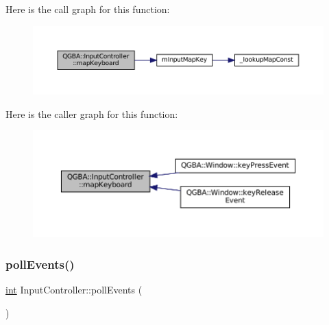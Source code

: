 Here is the call graph for this function\+:
\nopagebreak
\begin{figure}[H]
\begin{center}
\leavevmode
\includegraphics[width=350pt]{class_q_g_b_a_1_1_input_controller_a0b30490d7d98cf90002e1d7d4a9dde01_cgraph}
\end{center}
\end{figure}
Here is the caller graph for this function\+:
\nopagebreak
\begin{figure}[H]
\begin{center}
\leavevmode
\includegraphics[width=350pt]{class_q_g_b_a_1_1_input_controller_a0b30490d7d98cf90002e1d7d4a9dde01_icgraph}
\end{center}
\end{figure}
\mbox{\label{class_q_g_b_a_1_1_input_controller_a6bef594195d44a24fff69b4fd8aaeef1}} 
\subsubsection{\texorpdfstring{poll\+Events()}{pollEvents()}}
{\footnotesize\ttfamily \mbox{\hyperlink{ioapi_8h_a787fa3cf048117ba7123753c1e74fcd6}{int}} Input\+Controller\+::poll\+Events (\begin{DoxyParamCaption}{ }\end{DoxyParamCaption})}

